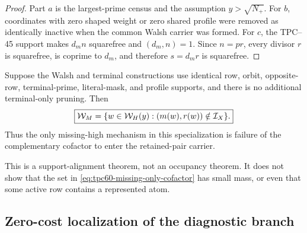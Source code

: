 \begin{proof}
Part \(a\) is the largest-prime census and the assumption
\(y>\sqrt{N_+}\).  For \(b\), coordinates with zero shaped weight or zero
shared profile were removed as identically inactive when the common Walsh
carrier was formed.  For \(c\), the TPC--45 support makes \(d_mn\)
squarefree and \((d_m,n)=1\).  Since \(n=pr\), every divisor \(r\) is
squarefree, is coprime to \(d_m\), and therefore \(s=d_mr\) is squarefree.
\end{proof}

\begin{corollary}
\label{cor:tpc60-identical-support-missing}
Suppose the Walsh and terminal constructions use identical row, orbit,
opposite-row, terminal-prime, literal-mask, and profile supports, and there
is no additional terminal-only pruning.  Then
\begin{equation}
 \boxed{
 \mathcal W_M
 =\{w\in\mathcal W_H(y):(m(w),r(w))\notin\mathcal I_X\}.}
 \label{eq:tpc60-missing-only-cofactor}
\end{equation}
Thus the only missing-high mechanism in this specialization is failure of
the complementary cofactor to enter the retained-pair carrier.
\end{corollary}

This is a support-alignment theorem, not an occupancy theorem.  It does not
show that the set in \eqref{eq:tpc60-missing-only-cofactor} has small mass,
or even that some active row contains a represented atom.

\subsection{Zero-cost localization of the diagnostic branch}

